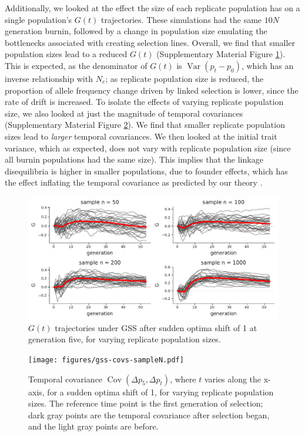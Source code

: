 \documentclass[11pt]{article}
\DeclareMathOperator{\var}{Var}
\DeclareMathOperator{\cov}{Cov}
\begin{document}
Additionally, we looked at the effect the size of each replicate population
  has on a single population's $G(t)$ trajectories. These simulations had the
  same $10N$ generation burnin, followed by a change in population size
  emulating the bottlenecks associated with creating selection lines. Overall,
  we find that smaller population sizes lead to a reduced $G(t)$ (Supplementary
  Material Figure \ref{suppfig:gss-G-sampleN}). This is expected, as the
  denominator of $G(t)$ is $\var(p_t - p_0)$, which has an inverse relationship
  with $N_e$; as replicate population size is reduced, the proportion of allele
  frequency change driven by linked selection is lower, since the rate of drift
  is increased. To isolate the effects of varying replicate population size, we
  also looked at just the magnitude of temporal covariances (Supplementary
  Material Figure \ref{suppfig:gss-covs-sampleN}). We find that smaller
  replicate population sizes lead to \emph{larger} temporal covariances. We
  then looked at the initial trait variance, which as expected, does not vary
  with replicate population size (since all burnin populations had the same
  size). This implies that the linkage disequilibria is higher in smaller
populations, due to founder effects, which has the effect inflating the
temporal covariance as predicted by our theory \parencite{Buffalo2019-io}.

\begin{figure}[!ht]
  \centering
  \includegraphics[width=\textwidth]{figures/gss-G-sampleN.pdf}

  \caption{$G(t)$ trajectories under GSS after sudden optima shift of 1 at
  generation five, for varying replicate population sizes.}

  \label{suppfig:gss-G-sampleN}
\end{figure}



\begin{figure}[!ht]
  \centering
  \texttt{[image: figures/gss-covs-sampleN.pdf]}

  \caption{Temporal covariance $\cov(\Delta p_5, \Delta p_t)$, where $t$ varies
  along the x-axis, for a sudden optima shift of 1, for varying replicate
population sizes. The reference time point is the first generation of
selection; dark gray points are the temporal covariance after selection began,
and the light gray points are before.}

  \label{suppfig:gss-covs-sampleN}
\end{figure}
\end{document}
